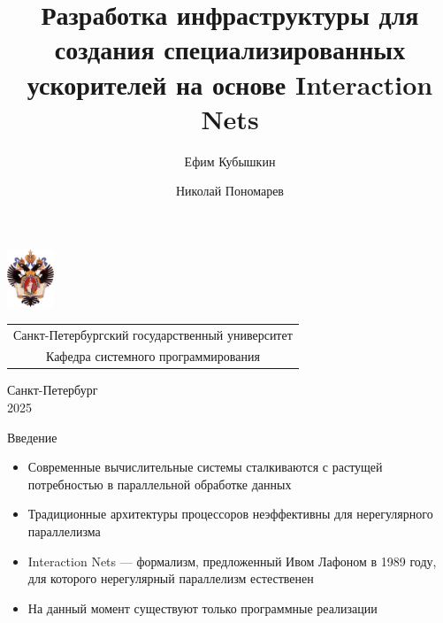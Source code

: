 \documentclass[aspectratio=169]{beamer}
\title[Lamagraph]{Разработка инфраструктуры для создания специализированных ускорителей на основе Interaction Nets}
\institute[СПбГУ]{}
\author{Ефим Кубышкин \and Николай Пономарев}
\date{}
\begin{document}
{
\begin{frame}
    \includegraphics[width=1.4cm]{pictures/SPbGU_Logo.png}
    \vspace{-35pt}
    \hspace{-10pt}
    \begin{center}
        \begin{tabular}{c}
            \scriptsize{Санкт-Петербургский государственный университет} \\
            \scriptsize{Кафедра системного программирования}
        \end{tabular}
        \titlepage
    \end{center}

    \btVFill

    \begin{center}
        \vspace{5pt}
        \scriptsize{Санкт-Петербург\\
            2025}
    \end{center}

\end{frame}
}

\begin{frame}{Введение}
    \begin{itemize}
        \item Современные вычислительные системы сталкиваются с растущей потребностью в параллельной обработке данных
        \item Традиционные архитектуры процессоров неэффективны для нерегулярного параллелизма
        \item[\faThumbsUp] Interaction Nets — формализм, предложенный Ивом Лафоном в 1989 году, для которого нерегулярный параллелизм естественен
        \item[\faThumbsDown] На данный момент существуют только программные реализации
    \end{itemize}
\end{frame}
\end{document}
